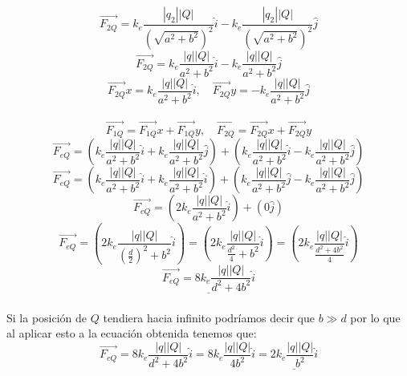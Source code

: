 \documentclass[12pt]{article}
\begin{document}
			$$ \vec{F_{2Q}} = k_e \frac{|q_2||Q|}{(\sqrt{a^2+b^2})^2} \hat{i} - k_e \frac{|q_2||Q|}{(\sqrt{a^2+b^2})^2} \hat{j} $$
			$$ \vec{F_{2Q}} = k_e \frac{|q||Q|}{a^2+b^2} \hat{i} - k_e \frac{|q||Q|}{a^2+b^2} \hat{j} $$
			$$ \vec{F_{2Q}}x = k_e \frac{|q||Q|}{a^2+b^2} \hat{i},\quad \vec{F_{2Q}}y = -k_e \frac{|q||Q|}{a^2+b^2} \hat{j} $$ \\
			$$ \vec{F_{1Q}} = \vec{F_{1Q}}x + \vec{F_{1Q}}y, \quad \vec{F_{2Q}} = \vec{F_{2Q}}x + \vec{F_{2Q}}y$$
			$$ \vec{F_{eQ}} = \left( k_e \frac{|q||Q|}{a^2+b^2} \hat{i} + k_e \frac{|q||Q|}{a^2+b^2} \hat{j} \right) 
			+ \left( k_e \frac{|q||Q|}{a^2+b^2} \hat{i} - k_e \frac{|q||Q|}{a^2+b^2} \hat{j} \right) $$ 
			$$ \vec{F_{eQ}} = \left( k_e \frac{|q||Q|}{a^2+b^2} \hat{i} + k_e \frac{|q||Q|}{a^2+b^2} \hat{i} \right) 
			+ \left( k_e \frac{|q||Q|}{a^2+b^2} \hat{j} - k_e \frac{|q||Q|}{a^2+b^2} \hat{j} \right) $$
			$$ \vec{F_{eQ}} = \left( 2k_e \frac{|q||Q|}{a^2+b^2} \hat{i} \right) + (0 \hat{j}) $$
			$$ \vec{F_{eQ}} = \left( 2k_e \frac{|q||Q|}{(\frac{d}{2})^2+b^2} \hat{i} \right) = \left( 2k_e \frac{|q||Q|}{\frac{d^2}{4}+b^2} \hat{i} \right) =
			\left( 2k_e \frac{|q||Q|}{\frac{d^2+4b^2}{4}} \hat{i} \right)$$
			$$ \underline{\vec{F_{eQ}} = 8k_e \frac{|q||Q|}{d^2+4b^2} \hat{i}} $$ \\
			Si la posición de $ Q $ tendiera hacia infinito podríamos decir que $ b \gg d $ por lo que al aplicar 
			esto a la ecuación obtenida tenemos que:
			$$ \vec{F_{eQ}} = 8k_e \frac{|q||Q|}{d^2+4b^2} \hat{i} = 8k_e \frac{|q||Q|}{4b^2} \hat{i} = \underline{2k_e \frac{|q||Q|}{b^2} \hat{i}} $$ \\
\end{document}
